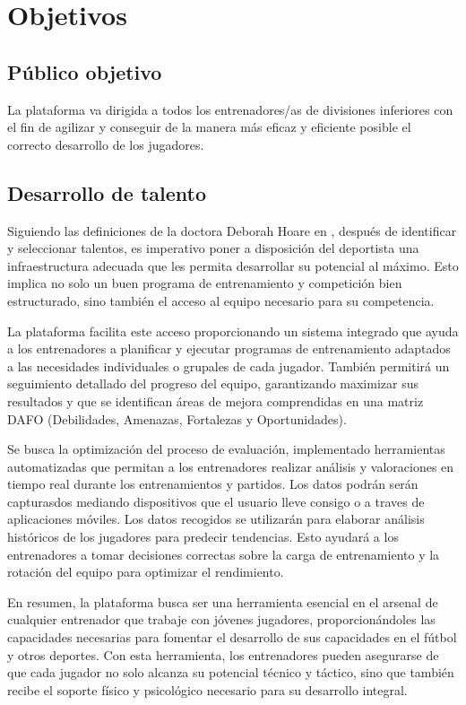 
\chapter{Objetivos}
\label{objetivos}

\section{Público objetivo}
La plataforma va dirigida a todos los entrenadores/as de divisiones inferiores con el fin de agilizar y conseguir de la manera más eficaz y eficiente posible el correcto desarrollo de los jugadores.

\section{Desarrollo de talento}
Siguiendo las definiciones de la doctora Deborah Hoare en \cite{DHoare}, después de identificar y seleccionar talentos, es imperativo poner a disposición del deportista una infraestructura adecuada que les permita desarrollar su potencial al máximo. Esto implica no solo un buen programa de entrenamiento y competición bien estructurado, sino también el acceso al equipo necesario para su competencia.

La plataforma facilita este acceso proporcionando un sistema integrado que ayuda a los entrenadores a planificar y ejecutar programas de entrenamiento adaptados a las necesidades individuales o grupales de cada jugador. También permitirá un seguimiento detallado del progreso del equipo, garantizando maximizar sus resultados y que se identifican áreas de mejora comprendidas en una matriz DAFO (Debilidades, Amenazas, Fortalezas y Oportunidades).

Se busca la optimización del proceso de evaluación, implementado herramientas automatizadas que permitan a los entrenadores realizar análisis y valoraciones en tiempo real durante los entrenamientos y partidos. Los datos podrán serán capturasdos mediando dispositivos que el usuario lleve consigo o a traves de aplicaciones móviles.
Los datos recogidos se utilizarán para elaborar análisis históricos de los jugadores para predecir tendencias. Esto ayudará a los entrenadores a tomar decisiones correctas sobre la carga de entrenamiento y la rotación del equipo para optimizar el rendimiento.

En resumen, la plataforma busca ser una herramienta esencial en el arsenal de cualquier entrenador que trabaje con jóvenes jugadores, proporcionándoles las capacidades necesarias para fomentar el desarrollo de sus capacidades en el fútbol y otros deportes. Con esta herramienta, los entrenadores pueden asegurarse de que cada jugador no solo alcanza su potencial técnico y táctico, sino que también recibe el soporte físico y psicológico necesario para su desarrollo integral.